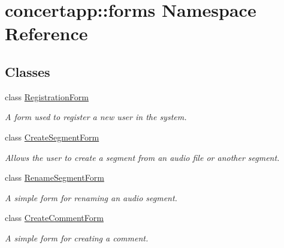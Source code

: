 \hypertarget{namespaceconcertapp_1_1forms}{
\section{concertapp::forms Namespace Reference}
\label{namespaceconcertapp_1_1forms}
}
\subsection*{Classes}
\begin{DoxyCompactItemize}
\item 
class \hyperlink{classconcertapp_1_1forms_1_1_registration_form}{RegistrationForm}
\begin{DoxyCompactList}\small\item\em A form used to register a new user in the system. \item\end{DoxyCompactList}\item 
class \hyperlink{classconcertapp_1_1forms_1_1_create_segment_form}{CreateSegmentForm}
\begin{DoxyCompactList}\small\item\em Allows the user to create a segment from an audio file or another segment. \item\end{DoxyCompactList}\item 
class \hyperlink{classconcertapp_1_1forms_1_1_rename_segment_form}{RenameSegmentForm}
\begin{DoxyCompactList}\small\item\em A simple form for renaming an audio segment. \item\end{DoxyCompactList}\item 
class \hyperlink{classconcertapp_1_1forms_1_1_create_comment_form}{CreateCommentForm}
\begin{DoxyCompactList}\small\item\em A simple form for creating a comment. \item\end{DoxyCompactList}\end{DoxyCompactItemize}
